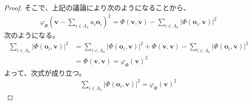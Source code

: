 \documentclass[dvipdfmx]{jsarticle}
\begin{document}
\begin{proof}
そこで、上記の議論により次のようになることから、
\begin{align*}
{\varphi_{\varPhi }\left( \mathbf{v} - \sum_{i \in \varLambda_{n}} {a_{i}\mathbf{o}_{i}} \right)}^{2} = \varPhi \left( \mathbf{v,v} \right) - \sum_{i \in \varLambda_{n}} \left| \varPhi \left( \mathbf{o}_{i},\mathbf{v} \right) \right|^{2}
\end{align*}
次のようになる。
\begin{align*}
\sum_{i \in \varLambda_{n}} \left| \varPhi \left( \mathbf{o}_{i},\mathbf{v} \right) \right|^{2} &= \sum_{i \in \varLambda_{n}} \left| \varPhi \left( \mathbf{o}_{i},\mathbf{v} \right) \right|^{2} + \varPhi \left( \mathbf{v,v} \right) - \sum_{i \in \varLambda_{n}} \left| \varPhi \left( \mathbf{o}_{i},\mathbf{v} \right) \right|^{2}\\
&= \varPhi \left( \mathbf{v,v} \right) = {\varphi_{\varPhi }\left( \mathbf{v} \right)}^{2}
\end{align*}
よって、次式が成り立つ。
\begin{align*}
\sum_{i \in \varLambda_{n}} \left| \varPhi \left( \mathbf{o}_{i},\mathbf{v} \right) \right|^{2} = {\varphi_{\varPhi }\left( \mathbf{v} \right)}^{2}
\end{align*}
\end{proof}
\end{document}

